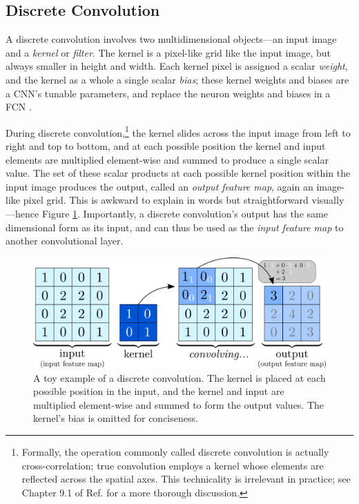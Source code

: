 \documentclass[11pt, a4paper]{article}
\begin{document}
\subsection{Discrete Convolution} \label{ss:discrete-conv}

A discrete convolution involves two multidimensional objects---an input image and a \textit{kernel} or \textit{filter}. The kernel is a pixel-like grid like the input image, but always smaller in height and width. Each kernel pixel is assigned a scalar \textit{weight}, and the kernel as a whole a single scalar \textit{bias}; these kernel weights and biases are a CNN's tunable parameters, and replace the neuron weights and biases in a FCN \cite{homl, goodfellow}.

During discrete convolution,\footnote{Formally, the operation commonly called discrete convolution is actually cross-correlation; true convolution employs a kernel whose elements are reflected across the spatial axes. This technicality is irrelevant in practice; see Chapter 9.1 of Ref. \cite{goodfellow} for a more thorough discussion.} the kernel slides across the input image from left to right and top to bottom, and at each possible position the kernel and input elements are multiplied element-wise and summed to produce a single scalar value. The set of these scalar products at each possible kernel position within the input image produces the output, called an \textit{output feature map}, again an image-like pixel grid. This is awkward to explain in words but straightforward visually---hence Figure \ref{fig:conv-single-channel}. Importantly, a discrete convolution's output has the same dimensional form as its input, and can thus be used as the \textit{input feature map} to another convolutional layer. 

\begin{figure}[htb!]
    \centering
    \includegraphics[width=0.8\linewidth]{vector/conv-single-channel.pdf}
    \vspace{-2mm}
    \caption{A toy example of a discrete convolution. The kernel is placed at each possible position in the input, and the kernel and input are multiplied element-wise and summed to form the output values. The kernel's bias is omitted for conciseness.}
    \label{fig:conv-single-channel}
\end{figure}
\end{document}

